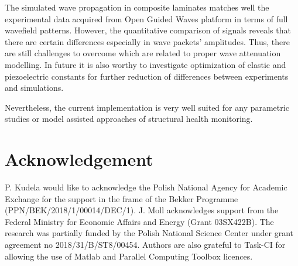 \documentclass[preprint,12pt]{elsarticle}
\begin{document}
	The simulated wave propagation in composite laminates matches well the experimental data acquired from Open Guided Waves platform in terms of full wavefield patterns. However, the quantitative comparison of signals reveals that there are certain differences especially in wave packets' amplitudes. Thus, there are still challenges to overcome which are related to proper wave attenuation modelling. In future it is also worthy to investigate optimization of elastic and piezoelectric constants for further reduction of differences between experiments and simulations.
	
	Nevertheless, the current implementation is very well suited for any parametric studies or model assisted approaches of structural health monitoring.
	 
	\section*{Acknowledgement}
	P. Kudela would like to acknowledge the Polish National Agency for Academic Exchange for the support in the frame of the Bekker Programme (PPN/BEK/2018/1/00014/DEC/1). J. Moll acknowledges support from the Federal Ministry for
	Economic Affairs and Energy (Grant 03SX422B). The research was partially funded by the Polish National Science Center under grant agreement no 2018/31/B/ST8/00454. Authors are also grateful to Task-CI for allowing the use of Matlab and Parallel Computing Toolbox licences. 
	
	
	
	
    
	{}
\end{document}
